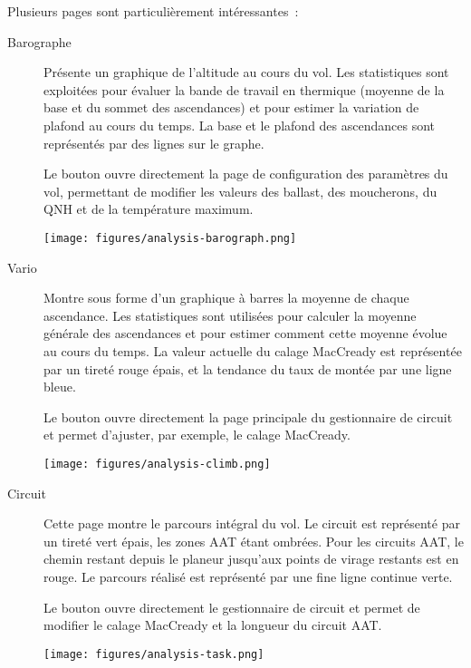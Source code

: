 Plusieurs pages sont particulièrement intéressantes~:
\begin{description}
\item[Barographe] Présente un graphique de l'altitude au cours du vol.
Les statistiques sont exploitées pour évaluer la bande de travail en thermique (moyenne
de la base et du sommet des ascendances) et pour estimer la variation de plafond au
cours du temps. La base et le plafond des ascendances sont représentés par des lignes sur le graphe. 

Le bouton  ouvre directement la page de configuration des paramètres du vol, permettant de modifier les valeurs des ballast, des moucherons, du QNH et de la température maximum.

\begin{center}
\texttt{[image: figures/analysis-barograph.png]}
\end{center}

\item[Vario]
Montre sous forme d'un graphique à barres la moyenne de chaque
ascendance. Les statistiques sont utilisées pour calculer la moyenne générale
des ascendances et pour estimer comment cette moyenne évolue au cours du temps. La
valeur actuelle du calage MacCready  est représentée par un tireté rouge
épais, et la tendance du taux de montée par une ligne bleue.

Le bouton  ouvre directement la page principale du gestionnaire de circuit et permet d'ajuster, par exemple, le calage MacCready.

\begin{center}
\texttt{[image: figures/analysis-climb.png]}
\end{center}

\item[Circuit]
Cette page montre le parcours intégral du vol. Le circuit
est représenté par un tireté vert épais, les zones AAT étant ombrées. Pour les circuits
AAT, le chemin restant depuis le planeur jusqu'aux points de virage restants
est en rouge. Le parcours réalisé est représenté par une fine ligne continue verte.

Le bouton  ouvre directement le gestionnaire de circuit et permet de modifier le calage MacCready et la longueur du circuit AAT.\@

\begin{center}
\texttt{[image: figures/analysis-task.png]}
\end{center}

\end{description}

